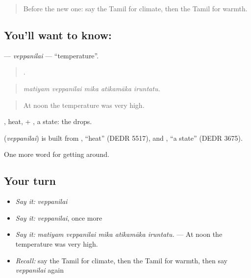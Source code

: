 \label{lesson:TA-C427-veppanilai}



\begin{quote}
Before the new one: say the Tamil for climate, then the Tamil for warmth.
\end{quote}

\subsection*{You'll want to know: }
\textbf{} — \emph{veppanilai} — \textquotedblleft{}temperature\textquotedblright{}.

\begin{quote}
    .
\end{quote}

\begin{quote}
\emph{matiyam veppanilai mika atikamāka iruntatu.}
\end{quote}

\begin{quote}
At noon the temperature was very high.
\end{quote}

, heat, + , a state: the  drops.

\begin{cousinweb}
\textbf{} (\emph{veppanilai}) is built from , \textquotedblleft{}heat\textquotedblright{} (DEDR 5517), and , \textquotedblleft{}a state\textquotedblright{} (DEDR 3675).
\end{cousinweb}

\begin{grammarlens}[title={What you've built}]
One more word for getting around.
\end{grammarlens}

\subsection*{Your turn}
\begin{itemize}
\raggedright
  \item \emph{Say it:} \emph{veppanilai}
  \item \emph{Say it:} \emph{veppanilai}, once more
  \item \emph{Say it:} \emph{matiyam veppanilai mika atikamāka iruntatu.} — At noon the temperature was very high.
  \item \emph{Recall:} say the Tamil for climate, then the Tamil for warmth, then say \emph{veppanilai} again
\end{itemize}

